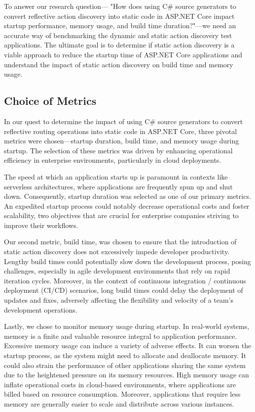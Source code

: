 To answer our research question— "How does using C\# source generators to convert reflective action discovery into static code in ASP.NET Core impact startup performance, memory usage, and build time duration?"—we need an accurate way of benchmarking the dynamic and static action discovery test applications. The ultimate goal is to determine if static action discovery is a viable approach to reduce the startup time of ASP.NET Core applications and understand the impact of static action discovery on build time and memory usage.

\subsection{Choice of Metrics}

In our quest to determine the impact of using C\# source generators to convert reflective routing operations into static code in ASP.NET Core, three pivotal metrics were chosen—startup duration, build time, and memory usage during startup. The selection of these metrics was driven by enhancing operational efficiency in enterprise environments, particularly in cloud deployments.

The speed at which an application starts up is paramount in contexts like serverless architectures, where applications are frequently spun up and shut down. Consequently, startup duration was selected as one of our primary metrics. An expedited startup process could notably decrease operational costs and foster scalability, two objectives that are crucial for enterprise companies striving to improve their workflows.

Our second metric, build time, was chosen to ensure that the introduction of static action discovery does not excessively impede developer productivity. Lengthy build times could potentially slow down the development process, posing challenges, especially in agile development environments that rely on rapid iteration cycles. Moreover, in the context of continuous integration / continuous deployment (CI/CD) scenarios, long build times could delay the deployment of updates and fixes, adversely affecting the flexibility and velocity of a team's development operations.

Lastly, we chose to monitor memory usage during startup. In real-world systems, memory is a finite and valuable resource integral to application performance. Excessive memory usage can induce a variety of adverse effects. It can worsen the startup process, as the system might need to allocate and deallocate memory. It could also strain the performance of other applications sharing the same system due to the heightened pressure on its memory resources. High memory usage can inflate operational costs in cloud-based environments, where applications are billed based on resource consumption. Moreover, applications that require less memory are generally easier to scale and distribute across various instances.

